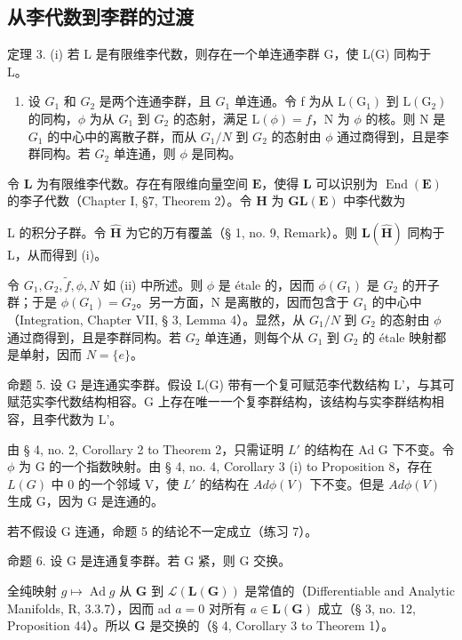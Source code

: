 \subsection{从李代数到李群的过渡}

定理 3. (i) 若 L 是有限维李代数，则存在一个单连通李群 G，使 L(G) 同构于 L。

\begin{enumerate}
\def\labelenumi{(\roman{enumi})}
\setcounter{enumi}{1}
\tightlist
\item
  设 \(G_{1}\) 和 \(G_{2}\) 是两个连通李群，且 \(G_{1}\) 单连通。令 f 为从 \(\mathrm{L}(\mathrm{G}_{1})\) 到 \(\mathrm{L}(\mathrm{G}_{2})\) 的同构，\(\phi\) 为从 \(G_{1}\) 到 \(G_{2}\) 的态射，满足 \(\mathrm{L}(\phi)=f\)，N 为 \(\phi\) 的核。则 N 是 \(G_{1}\) 的中心中的离散子群，而从 \(G_{1}/N\) 到 \(G_{2}\) 的态射由 \(\phi\) 通过商得到，且是李群同构。若 \(G_{2}\) 单连通，则 \(\phi\) 是同构。
\end{enumerate}

令 \(\mathbf{L}\) 为有限维李代数。存在有限维向量空间 \(\mathbf{E}\)，使得 \(\mathbf{L}\) 可以识别为 \(\operatorname{End}(\mathbf{E})\) 的李子代数（Chapter I, §7, Theorem 2）。令 \(\mathbf{H}\) 为 \(\mathbf{GL}(\mathbf{E})\) 中李代数为

L 的积分子群。令 \(\hat{\mathbf{H}}\) 为它的万有覆盖（§ 1, no. 9, Remark）。则 \(\mathbf{L}(\hat{\mathbf{H}})\) 同构于 L，从而得到 (i)。

  令 \(G_{1}, G_{2}, \tilde{f}, \phi, N\) 如 (ii) 中所述。则 \(\phi\) 是 étale 的，因而 \(\phi(G_{1})\) 是 \(G_{2}\) 的开子群；于是 \(\phi(G_{1}) = G_{2}\)。另一方面，N 是离散的，因而包含于 \(G_{1}\) 的中心中（Integration, Chapter VII, § 3, Lemma 4）。显然，从 \(G_{1}/N\) 到 \(G_{2}\) 的态射由 \(\phi\) 通过商得到，且是李群同构。若 \(G_{2}\) 单连通，则每个从 \(G_{1}\) 到 \(G_{2}\) 的 étale 映射都是单射，因而 \(N = \{e\}\)。

命题 5. 设 G 是连通实李群。假设 L(G) 带有一个复可赋范李代数结构 L'，与其可赋范实李代数结构相容。G 上存在唯一一个复李群结构，该结构与实李群结构相容，且李代数为 L'。

由 § 4, no. 2, Corollary 2 to Theorem 2，只需证明 \(L'\) 的结构在 Ad G 下不变。令 \(\phi\) 为 G 的一个指数映射。由 § 4, no. 4, Corollary 3 (i) to Proposition 8，存在 \(L(G)\) 中 0 的一个邻域 V，使 \(L'\) 的结构在 \(Ad\phi(V)\) 下不变。但是 \(Ad\phi(V)\) 生成 G，因为 G 是连通的。

若不假设 G 连通，命题 5 的结论不一定成立（练习 7）。

命题 6. 设 G 是连通复李群。若 G 紧，则 G 交换。

全纯映射 \(g \mapsto \operatorname{Ad} g\) 从 \(\mathbf{G}\) 到 \(\mathcal{L}(\mathbf{L}(\mathbf{G}))\) 是常值的（Differentiable and Analytic Manifolds, R, 3.3.7），因而 ad \(a = 0\) 对所有 \(a \in \mathbf{L}(\mathbf{G})\) 成立（§ 3, no. 12, Proposition 44）。所以 \(\mathbf{G}\) 是交换的（§ 4, Corollary 3 to Theorem 1）。

